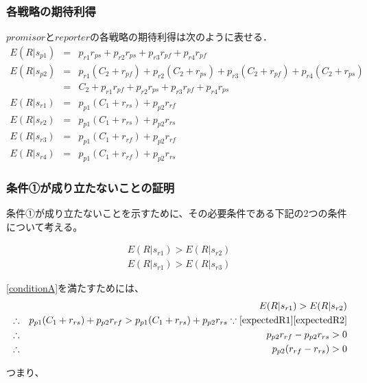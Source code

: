 \subsubsection{各戦略の期待利得}
$promisor$と$reporter$の各戦略の期待利得は次のように表せる．
\begin{eqnarray}
  E(R|s_{p1}) &=& p_{r1}r_{ps}+p_{r2}r_{ps}+p_{r3}r_{pf}+p_{r4}r_{pf} \label{expectedA} \\
  E(R|s_{p2}) &=& p_{r1} (C_2 + r_{pf}) + p_{r2} (C_2 + r_{ps}) + p_{r3} (C_2 + r_{pf} ) + p_{r4} (C_2 + r_{ps}) \nonumber \\
              &=& C_2 + p_{r1} r_{pf} + p_{r2} r_{ps} + p_{r3} r_{pf} + p_{r4} r_{ps} \label{expectedB} \\
  E(R|s_{r1}) &=& p_{p1} (C_1 + r_{rs}) + p_{p2} r_{rf} \label{expectedR1} \\
  E(R|s_{r2}) &=& p_{p1} (C_1 + r_{rs}) + p_{p2} r_{rs} \label{expectedR2} \\
  E(R|s_{r3}) &=& p_{p1} (C_1 + r_{rf}) + p_{p2} r_{rf} \label{expectedR3} \\
  E(R|s_{r4}) &=& p_{p1} (C_1 + r_{rf}) + p_{p2} r_{rs} \label{expectedR4} \nonumber
\end{eqnarray}

\subsubsection{条件①が成り立たないことの証明}

条件①が成り立たないことを示すために、その必要条件である下記の2つの条件について考える。

\begin{gather}
  E(R|s_{r1}) > E(R|s_{r2}) \label{conditionA} \\
  E(R|s_{r1}) > E(R|s_{r3}) \label{conditionB}
\end{gather}

\eqref{conditionA}を満たすためには、
\begin{eqnarray*}
  &&E(R|s_{r1}) > E(R|s_{r2}) \\
  &\therefore& p_{p1} (C_1 + r_{rs}) + p_{p2} r_{rf} > p_{p1} (C_1 + r_{rs}) + p_{p2} r_{rs} \because\eqref{expectedR1}\eqref{expectedR2}  \\
  &\therefore& p_{p2} r_{rf} - p_{p2} r_{rs} > 0 \\
  &\therefore& p_{p2} (r_{rf} - r_{rs}) > 0 \\
\end{eqnarray*}

つまり、

